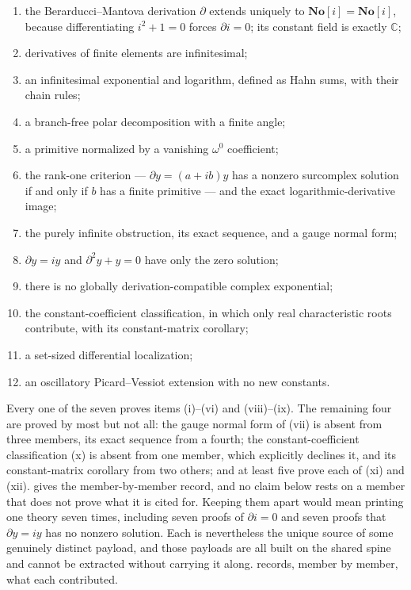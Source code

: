 \documentclass[11pt,letterpaper]{article}
\numberwithin{equation}{section}
\theoremstyle{definition}
\theoremstyle{remark}
\newcommand{\No}{\mathbf{No}}
\newcommand{\SC}{\mathbf{No}[i]}
\newcommand{\C}{\mathbb C}
\newcommand{\der}{\partial}
\begin{document}
\begin{enumerate}[label=(\roman*),leftmargin=2.6em]
\item the Berarducci--Mantova derivation $\der$ extends uniquely to
$\SC=\No[i]$, because differentiating $i^{2}+1=0$ forces $\der i=0$; its
constant field is exactly $\C$;
\item derivatives of finite elements are infinitesimal;
\item an infinitesimal exponential and logarithm, defined as Hahn sums, with
their chain rules;
\item a branch-free polar decomposition with a finite angle;
\item a primitive normalized by a vanishing $\omega^{0}$ coefficient;
\item the rank-one criterion --- $\der y=(a+ib)y$ has a nonzero surcomplex
solution if and only if $b$ has a finite primitive --- and the exact
logarithmic-derivative image;
\item the purely infinite obstruction, its exact sequence, and a gauge normal
form;
\item $\der y=iy$ and $\der^{2}y+y=0$ have only the zero solution;
\item there is no globally derivation-compatible complex exponential;
\item the constant-coefficient classification, in which only real
characteristic roots contribute, with its constant-matrix corollary;
\item a set-sized differential localization;
\item an oscillatory Picard--Vessiot extension with no new constants.
\end{enumerate}

Every one of the seven proves items (i)--(vi) and (viii)--(ix).  The
remaining four are proved by most but not all: the gauge normal form of (vii)
is absent from three members, its exact sequence from a fourth; the
constant-coefficient classification (x) is absent from one member, which
explicitly declines it, and its constant-matrix corollary from two others; and
at least five prove each of (xi) and (xii).   gives
the member-by-member record, and no claim below rests on a member that does not
prove what it is cited for. Keeping them apart would mean printing one theory seven times,
including seven proofs of $\der i=0$ and seven proofs that $\der y=iy$ has no
nonzero solution. Each is nevertheless the unique source of some genuinely
distinct payload, and those payloads are all built on the shared spine and
cannot be extracted without carrying it along. 
records, member by member, what each contributed.
\end{document}
